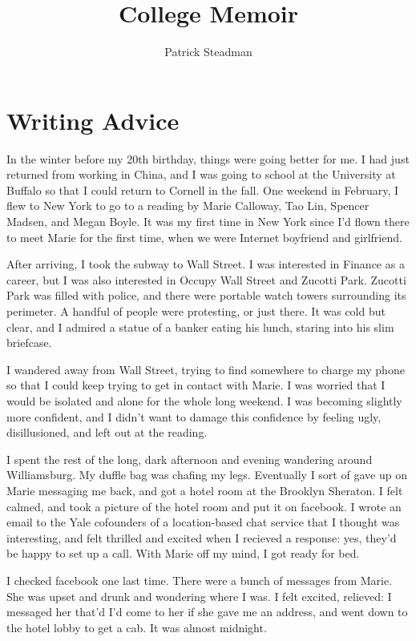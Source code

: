 \documentclass[12pt]{article}
\title{College Memoir}
\author{Patrick Steadman}
\begin{document}
\maketitle

\section{Writing Advice}
In the winter before my 20th birthday, things were going better for me.  I had
just returned from working in China, and I was going to school at the University
at Buffalo so that I could return to Cornell in the fall.  One weekend in
February, I flew to New York to go to a reading by Marie Calloway, Tao Lin,
Spencer Madsen, and Megan Boyle.  It was my first time in New York since I'd
flown there to meet Marie for the first time, when we were Internet boyfriend and
girlfriend.  

After arriving, I took the subway to Wall Street.  I was interested in Finance
as a career, but I was also interested in Occupy Wall Street and Zucotti Park.
Zucotti Park was filled with police, and there were portable watch towers
surrounding its perimeter.  A handful of people were protesting, or just there.
It was cold but clear, and I admired a statue of a banker eating his lunch,
staring into his slim briefcase.

I wandered away from Wall Street, trying to find somewhere to charge my phone so
that I could keep trying to get in contact with Marie. I was worried that I
would be isolated and alone for the whole long weekend.  I was becoming slightly
more confident, and I didn't want to damage this confidence by feeling ugly,
disillusioned, and left out at the reading.

I spent the rest of the long, dark afternoon and evening wandering around
Williamsburg.  My duffle bag was chafing my legs.  Eventually I sort
of gave up on Marie messaging me back, and got a hotel room at the Brooklyn
Sheraton.  I felt calmed, and took a picture of the hotel room and put it on
facebook.  I wrote an email to the Yale cofounders of a location-based chat
service that I thought was interesting, and felt thrilled and excited when I
recieved a response: yes, they'd be happy to set up a call.  With Marie off my
mind, I got ready for bed.  

I checked facebook one last time.  There were a bunch of messages from Marie.
She was upset and drunk and wondering where I was.  I felt excited, relieved: I
messaged her that'd I'd come to her if she gave me an address, and went down to
the hotel lobby to get a cab.  It was almost midnight.
\end{document}

